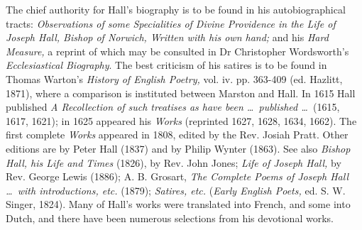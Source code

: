 The chief authority for Hall's biography is to be found in his autobiographical tracts: \emph{Observations of some Specialities of Divine Providence in the Life of Joseph Hall, Bishop of Norwich, Written with his own hand;} and his \emph{Hard Measure,} a reprint of which may be consulted in Dr Christopher Wordsworth's \emph{Ecclesiastical Biography}. The best criticism of his satires is to be found in Thomas Warton's \emph{History of English Poetry,} vol. iv. pp. 363-409 (ed. Hazlitt, 1871), where a comparison is instituted between Marston and Hall. In 1615 Hall published \emph{A Recollection of such treatises as have been \ldots\ published \ldots\ }(1615, 1617, 1621); in 1625 appeared his \emph{Works} (reprinted 1627, 1628, 1634, 1662). The first complete \emph{Works} appeared in 1808, edited by the Rev. Josiah Pratt. Other editions are by Peter Hall (1837) and by Philip Wynter (1863). See also \emph{Bishop Hall, his Life and Times} (1826), by Rev. John Jones; \emph{Life of Joseph Hall,} by Rev. George Lewis (1886); A. B. Grosart, \emph{The Complete Poems of Joseph Hall \ldots\ with introductions, etc.} (1879); \emph{Satires, etc.} (\emph{Early English Poets,} ed. S. W. Singer, 1824). Many of Hall's works were translated into French, and some into Dutch, and there have been numerous selections from his devotional works.